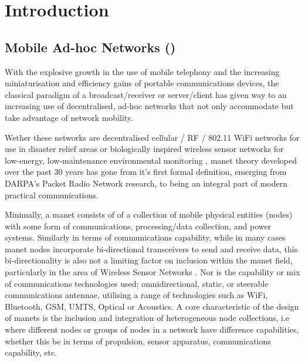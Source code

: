 \def\ChapterTitle{Introduction} %

\ifx\ifthesis\undefined

\else
\chapter{\ChapterTitle}
\label{Chapter\thechapter}
\fi

\section{Mobile Ad-hoc Networks ()}

With the explosive growth in the use of mobile telephony and the increasing miniaturisation and efficiency gains of portable communications devices, the classical paradigm of a broadcast/receiver or server/client has given way to an increasing use of decentralised, ad-hoc networks that not only accommodate but take advantage of network mobility.

Wether these networks are decentralised cellular / RF / 802.11 WiFi networks for use in disaster relief areas \cite{Milliken2015} or biologically inspired wireless sensor networks for low-energy, low-maintenance environmental monitoring \cite{Bhargavi2015}, \gls{manet} theory developed over the past 30 years has gone from it's first formal definition, emerging from DARPA's Packet Radio Network research\cite{Jubin1987}, to being an integral part of modern practical communications.

Minimally, a \gls{manet} consists of of a collection of mobile physical entities (nodes) with some form of communications, processing/data collection, and power systems.
Similarly in terms of communications capability, while in many cases \gls{manet} nodes incorporate bi-directional transceivers to send and receive data, this bi-directionality is also not a limiting factor on inclusion within the \gls{manet} field, particularly in the area of Wireless Sensor Networks \cite{Akyildiz2002}.
Nor is the capability or mix of communications technologies used; omnidirectional, static, or steerable communications antennae, utilising a range of technologies such as WiFi, Bluetooth, GSM, UMTS, Optical or Acoustics.
A core characteristic of the design of \glspl{manet} is the inclusion and integration of heterogeneous node collections, i.e where different nodes or groups of nodes in a network have difference capabilities, whether this be in terms of propulsion, sensor apparatus, communications capability, etc.

